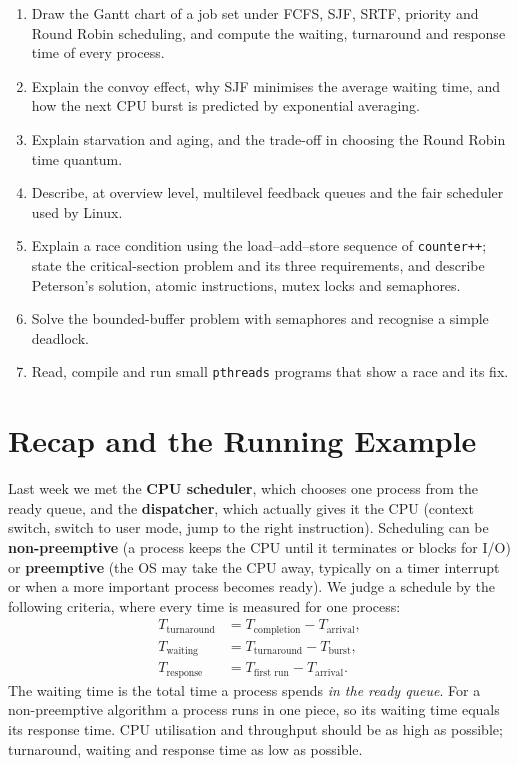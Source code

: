 \documentclass[11pt,a4paper]{article}
\newcommand{\term}[1]{\textbf{\color{mintdeep}#1}}
\newcommand{\cmd}[1]{\texttt{#1}}
\begin{document}
\vspace{0.8em}
\begin{keyidea}
\begin{enumerate}[leftmargin=1.4em]
  \item Draw the Gantt chart of a job set under FCFS, SJF, SRTF, priority and Round Robin scheduling, and compute the waiting, turnaround and response time of every process.
  \item Explain the convoy effect, why SJF minimises the average waiting time, and how the next CPU burst is predicted by exponential averaging.
  \item Explain starvation and aging, and the trade-off in choosing the Round Robin time quantum.
  \item Describe, at overview level, multilevel feedback queues and the fair scheduler used by Linux.
  \item Explain a race condition using the load--add--store sequence of \cmd{counter++}; state the critical-section problem and its three requirements, and describe Peterson's solution, atomic instructions, mutex locks and semaphores.
  \item Solve the bounded-buffer problem with semaphores and recognise a simple deadlock.
  \item Read, compile and run small \texttt{pthreads} programs that show a race and its fix.
\end{enumerate}
\end{keyidea}

\setcounter{tocdepth}{1}
\tableofcontents

\section{Recap and the Running Example}

Last week we met the \term{CPU scheduler}, which chooses one process from the ready queue, and the \term{dispatcher}, which actually gives it the CPU (context switch, switch to user mode, jump to the right instruction). Scheduling can be \term{non-preemptive} (a process keeps the CPU until it terminates or blocks for I/O) or \term{preemptive} (the OS may take the CPU away, typically on a timer interrupt or when a more important process becomes ready). We judge a schedule by the following criteria, where every time is measured for one process:
\begin{align*}
T_{\text{turnaround}} &= T_{\text{completion}} - T_{\text{arrival}},\\
T_{\text{waiting}} &= T_{\text{turnaround}} - T_{\text{burst}},\\
T_{\text{response}} &= T_{\text{first run}} - T_{\text{arrival}}.
\end{align*}
The waiting time is the total time a process spends \emph{in the ready queue}. For a non-preemptive algorithm a process runs in one piece, so its waiting time equals its response time. CPU utilisation and throughput should be as high as possible; turnaround, waiting and response time as low as possible.
\end{document}
